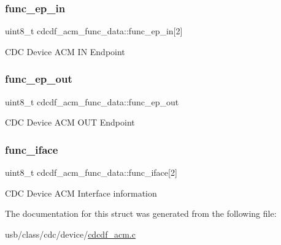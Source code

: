 \subsubsection{\texorpdfstring{func\+\_\+ep\+\_\+in}{func\_ep\_in}}
{\footnotesize\ttfamily uint8\+\_\+t cdcdf\+\_\+acm\+\_\+func\+\_\+data\+::func\+\_\+ep\+\_\+in\mbox{[}2\mbox{]}}

C\+DC Device A\+CM IN Endpoint \mbox{\label{structcdcdf__acm__func__data_a4ed25f383f77e89eb3ce6b5a48b99c6f}} 
\subsubsection{\texorpdfstring{func\+\_\+ep\+\_\+out}{func\_ep\_out}}
{\footnotesize\ttfamily uint8\+\_\+t cdcdf\+\_\+acm\+\_\+func\+\_\+data\+::func\+\_\+ep\+\_\+out}

C\+DC Device A\+CM O\+UT Endpoint \mbox{\label{structcdcdf__acm__func__data_abe8f7690dc20ef4a5a575596e6c239a3}} 
\subsubsection{\texorpdfstring{func\+\_\+iface}{func\_iface}}
{\footnotesize\ttfamily uint8\+\_\+t cdcdf\+\_\+acm\+\_\+func\+\_\+data\+::func\+\_\+iface\mbox{[}2\mbox{]}}

C\+DC Device A\+CM Interface information 

The documentation for this struct was generated from the following file\+:\begin{DoxyCompactItemize}
\item 
usb/class/cdc/device/\hyperlink{cdcdf__acm_8c}{cdcdf\+\_\+acm.\+c}\end{DoxyCompactItemize}
